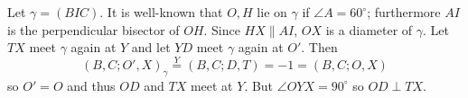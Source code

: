 Let $\gamma=\left(BIC\right)$. It is well-known that $O,H$ lie on $\gamma$ if $\angle{A}=60^\circ$; furthermore $AI$ is the perpendicular bisector of $OH$. Since $HX\parallel AI$, $OX$ is a diameter of $\gamma$. Let $TX$ meet $\gamma$ again at $Y$ and let $YD$ meet $\gamma$ again at $O'$. Then \[\left(B,C;O',X\right)_{\gamma}\stackrel{Y}{=}\left(B,C;D,T\right)=-1=\left(B,C;O,X\right)\] so $O'=O$ and thus $OD$ and $TX$ meet at $Y$. But $\angle{OYX}=90^\circ$ so $OD\perp TX$.